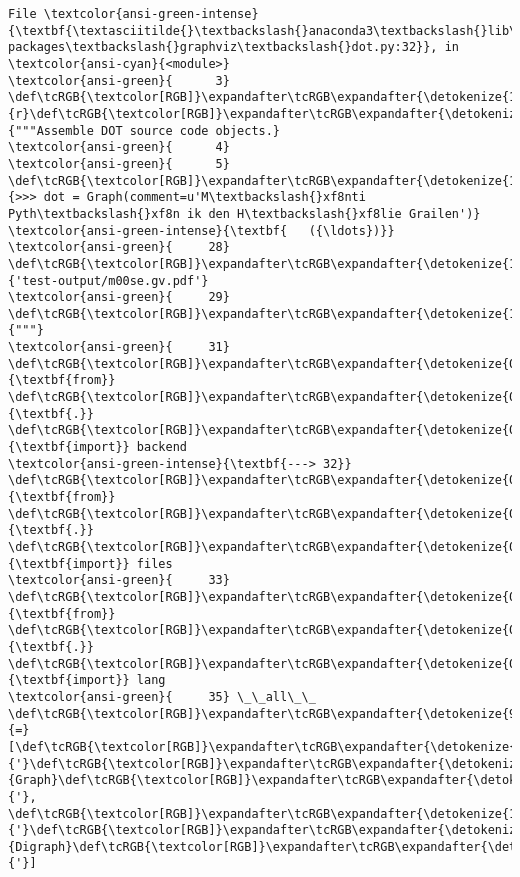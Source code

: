 \documentclass[11pt]{article}
\begin{document}
\begin{Verbatim}[commandchars=\\\{\}, frame=single, framerule=2mm, rulecolor=\color{outerrorbackground}]
File \textcolor{ansi-green-intense}{\textbf{\textasciitilde{}\textbackslash{}anaconda3\textbackslash{}lib\textbackslash{}site-packages\textbackslash{}graphviz\textbackslash{}dot.py:32}}, in \textcolor{ansi-cyan}{<module>}
\textcolor{ansi-green}{      3} \def\tcRGB{\textcolor[RGB]}\expandafter\tcRGB\expandafter{\detokenize{175,0,0}}{r}\def\tcRGB{\textcolor[RGB]}\expandafter\tcRGB\expandafter{\detokenize{175,0,0}}{"""Assemble DOT source code objects.}
\textcolor{ansi-green}{      4} 
\textcolor{ansi-green}{      5} \def\tcRGB{\textcolor[RGB]}\expandafter\tcRGB\expandafter{\detokenize{175,0,0}}{>>> dot = Graph(comment=u'M\textbackslash{}xf8nti Pyth\textbackslash{}xf8n ik den H\textbackslash{}xf8lie Grailen')}
\textcolor{ansi-green-intense}{\textbf{   ({\ldots})}}
\textcolor{ansi-green}{     28} \def\tcRGB{\textcolor[RGB]}\expandafter\tcRGB\expandafter{\detokenize{175,0,0}}{'test-output/m00se.gv.pdf'}
\textcolor{ansi-green}{     29} \def\tcRGB{\textcolor[RGB]}\expandafter\tcRGB\expandafter{\detokenize{175,0,0}}{"""}
\textcolor{ansi-green}{     31} \def\tcRGB{\textcolor[RGB]}\expandafter\tcRGB\expandafter{\detokenize{0,135,0}}{\textbf{from}} \def\tcRGB{\textcolor[RGB]}\expandafter\tcRGB\expandafter{\detokenize{0,0,255}}{\textbf{.}} \def\tcRGB{\textcolor[RGB]}\expandafter\tcRGB\expandafter{\detokenize{0,135,0}}{\textbf{import}} backend
\textcolor{ansi-green-intense}{\textbf{---> 32}} \def\tcRGB{\textcolor[RGB]}\expandafter\tcRGB\expandafter{\detokenize{0,135,0}}{\textbf{from}} \def\tcRGB{\textcolor[RGB]}\expandafter\tcRGB\expandafter{\detokenize{0,0,255}}{\textbf{.}} \def\tcRGB{\textcolor[RGB]}\expandafter\tcRGB\expandafter{\detokenize{0,135,0}}{\textbf{import}} files
\textcolor{ansi-green}{     33} \def\tcRGB{\textcolor[RGB]}\expandafter\tcRGB\expandafter{\detokenize{0,135,0}}{\textbf{from}} \def\tcRGB{\textcolor[RGB]}\expandafter\tcRGB\expandafter{\detokenize{0,0,255}}{\textbf{.}} \def\tcRGB{\textcolor[RGB]}\expandafter\tcRGB\expandafter{\detokenize{0,135,0}}{\textbf{import}} lang
\textcolor{ansi-green}{     35} \_\_all\_\_ \def\tcRGB{\textcolor[RGB]}\expandafter\tcRGB\expandafter{\detokenize{98,98,98}}{=} [\def\tcRGB{\textcolor[RGB]}\expandafter\tcRGB\expandafter{\detokenize{175,0,0}}{'}\def\tcRGB{\textcolor[RGB]}\expandafter\tcRGB\expandafter{\detokenize{175,0,0}}{Graph}\def\tcRGB{\textcolor[RGB]}\expandafter\tcRGB\expandafter{\detokenize{175,0,0}}{'}, \def\tcRGB{\textcolor[RGB]}\expandafter\tcRGB\expandafter{\detokenize{175,0,0}}{'}\def\tcRGB{\textcolor[RGB]}\expandafter\tcRGB\expandafter{\detokenize{175,0,0}}{Digraph}\def\tcRGB{\textcolor[RGB]}\expandafter\tcRGB\expandafter{\detokenize{175,0,0}}{'}]


\end{Verbatim}
\end{document}
